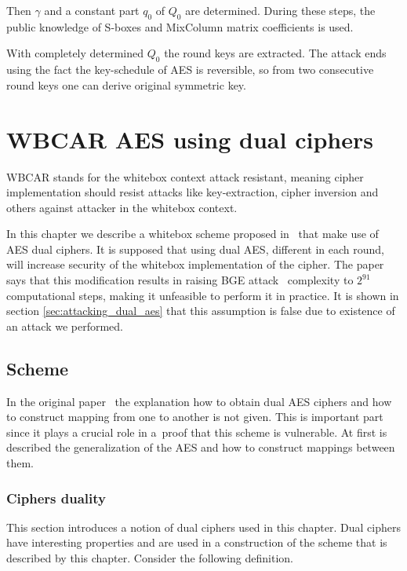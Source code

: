 \documentclass[11pt,oneside,final]{fithesis2}
\begin{document}
    Then $\gamma$ and a constant part $q_0$ of $Q_0$ are determined. During these steps, the public knowledge of S-boxes and MixColumn matrix coefficients is used.
    
    With completely determined $Q_0$ the round keys are extracted.
    The attack ends using the fact the key-schedule of AES is reversible, so from two consecutive round keys one can derive original symmetric key.
    
\chapter{WBCAR AES using dual ciphers}\label{sec:wb_dual_aes_sec}
    WBCAR stands for the  whitebox context attack resistant, meaning cipher implementation should resist attacks like key-extraction, cipher inversion
    and others against attacker in the whitebox context.
    
    In this chapter we describe a whitebox scheme proposed in~\citep{Karroumi:2010:PWA:2041036.2041060} that make use of AES dual ciphers. It is supposed 
    that using dual AES, different in each round, will increase security of the whitebox implementation of the cipher. The paper says that this modification
    results in raising BGE attack~\citep{Billet:2004:CWB:2080787.2080809} complexity to $2^{91}$ computational steps, making it unfeasible to perform it in practice. It is shown in section
    \ref{sec:attacking_dual_aes} that this assumption is false due to existence of an attack we performed.
    
    
    \section{Scheme}

    In the original paper~\citep{Karroumi:2010:PWA:2041036.2041060} the explanation how to obtain dual AES ciphers and how to construct mapping from one 
    to another is not given. This is
    important part since it plays a crucial role in a~proof that this scheme is vulnerable. At first is described the generalization of the AES and how to construct
    mappings between them. 

	\subsection{Ciphers duality}
	This section introduces a notion of dual ciphers used in this chapter. Dual ciphers have interesting properties and are used in a construction
	of the scheme that is described by this chapter. Consider the following definition.
	
\end{document}
